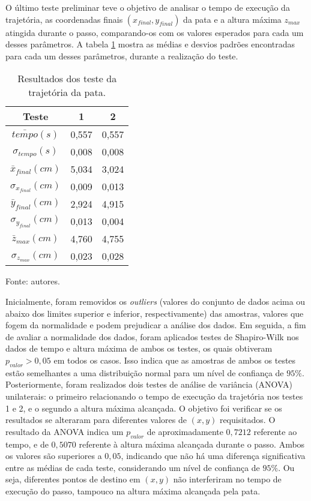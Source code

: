 \documentclass[conference]{IEEEtran}
\begin{document}
  O último teste preliminar teve o objetivo de analisar o tempo de execução da trajetória, as coordenadas finais $(x_{final}, y_{final})$ da pata e a altura máxima $z_{max}$ atingida durante o passo, comparando-os com os valores esperados para cada um desses parâmetros. A tabela \ref{tab:trajetoria} mostra as médias e desvios padrões encontradas para cada um desses parâmetros, durante a realização do teste.

  \begin{table}[!htb]
    \centering
    \begin{tabular}{ccc}
      \hline
      \textbf{Teste} & \textbf{1}      & \textbf{2}  \\
      \hline
      $\bar{tempo} (s)$         & 0,557  & 0,557 \\
      \hline
      $\sigma_{tempo} (s)$       & 0,008  & 0,008 \\
      \hline
      $\bar{x}_{final} (cm)$     & 5,034  & 3,024 \\
      \hline
      $\sigma_{x_{final}} (cm)$  & 0,009  & 0,013 \\
      \hline
      $\bar{y}_{final} (cm)$     & 2,924  & 4,915 \\      
      \hline
      $\sigma_{y_{final}} (cm)$  & 0,013  & 0,004 \\      
      \hline
      $\bar{z}_{max} (cm)$       & 4,760  & 4,755 \\      
      \hline
      $\sigma_{z_{max}} (cm)$    & 0,023  & 0,028 \\
      \hline   
    \end{tabular}

    \caption{Resultados dos teste da trajetória da pata.}
    Fonte: autores.
    \vspace{-\baselineskip}
    \label{tab:trajetoria}
  \end{table}
  

  Inicialmente, foram removidos os \textit{outliers} (valores do conjunto de dados acima ou abaixo dos limites superior e inferior, respectivamente) das amostras, valores que fogem da normalidade e podem prejudicar a análise dos dados. Em seguida, a fim de avaliar a normalidade dos dados, foram aplicados testes de Shapiro-Wilk nos dados de tempo e altura máxima de ambos os testes, os quais obtiveram $p_{valor} > 0,05$ em todos os casos. Isso indica que as amostras de ambos os testes estão semelhantes a uma distribuição normal para um nível de confiança de $95\%$. Posteriormente, foram realizados dois testes de análise de variância (ANOVA) unilaterais: o primeiro relacionando o tempo de execução da trajetória nos testes 1 e 2, e o segundo a altura máxima alcançada. O objetivo foi verificar se os resultados se alteraram para diferentes valores de $(x, y)$ requisitados. O resultado da ANOVA indica um $p_{valor}$ de aproximadamente $0,7212$ referente ao tempo, e de $0,5070$ referente à altura máxima alcançada durante o passo. Ambos os valores são superiores a $0,05$, indicando que não há uma diferença significativa entre as médias de cada teste, considerando um nível de confiança de $95\%$. Ou seja, diferentes pontos de destino em $(x, y)$ não interferiram no tempo de execução do passo, tampouco na altura máxima alcançada pela pata.
\end{document}

